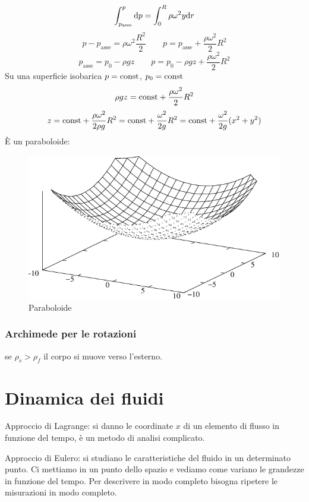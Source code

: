 $$\int_{p_\text{asse}}^p\mathrm{d} p=\int_0^R \rho\omega^2 y\mathrm{d} r$$
$$p-p_\text{asse}=\rho\omega^2\frac{R^2}{2}\qquad p=p_\text{asse}+\frac{\rho\omega^2}{2}R^2$$
$$p_\text{asse}=p_0-\rho gz\qquad p=p_0-\rho gz+\frac{\rho\omega^2}{2}R^2$$
Su una superficie isobarica $p=\text{const}$, $p_0=\text{const}$
$$\rho gz=\text{const}+\frac{\rho\omega^2}{2}R^2$$
$$z=\text{const}+\frac{\rho\omega^2}{2\rho g}R^2=\text{const}+\frac{\omega^2}{2g}R^2=\text{const}+\frac{\omega^2}{2g}(x^2+y^2)$$
\`E un paraboloide:
\begin{figure}[htbp]
\centering
\includegraphics[scale=1]{immagini/fisica1/paraboloide}
\caption{Paraboloide}
\end{figure}
\subsubsection{Archimede per le rotazioni}
se $\rho_s>\rho_f$ il corpo si muove verso l'esterno.


\section{Dinamica dei fluidi}

Approccio di Lagrange: si danno le coordinate $x$ di un elemento di flusso in funzione del tempo, è un metodo di analisi complicato.

Approccio di Eulero: si studiano le caratteristiche del fluido in un determinato punto. Ci mettiamo in un punto dello spazio e vediamo come variano le grandezze in funzione del tempo. Per descrivere in modo completo bisogna ripetere le misurazioni in modo completo.

